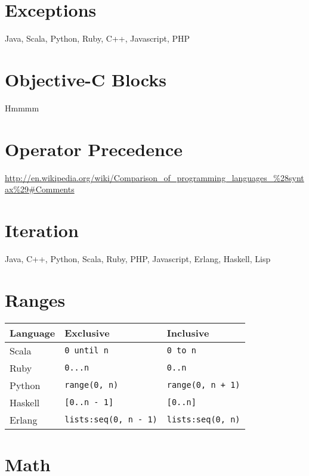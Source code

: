 \documentclass{article}
\begin{document}
\section{Exceptions}
Java, Scala, Python, Ruby, C++, Javascript, PHP

\section{Objective-C Blocks}
Hmmmm

\section{Operator Precedence}
\url{http://en.wikipedia.org/wiki/Comparison_of_programming_languages_%28syntax%29#Comments}

\section{Iteration}
Java, C++, Python, Scala, Ruby, PHP, Javascript, Erlang, Haskell, Lisp

\section{Ranges}
\begin{longtabu} to 0.75\linewidth { X X X }
	Language & Exclusive & Inclusive \\
	\hline
	Scala & \lstinline$0 until n$ & \lstinline$0 to n$ \\
	Ruby & \lstinline$0...n$ & \lstinline$0..n$ \\
	Python & \lstinline$range(0, n)$ & \lstinline$range(0, n + 1)$ \\
	Haskell & \lstinline$[0..n - 1]$ & \lstinline$[0..n]$ \\
	Erlang & \lstinline$lists:seq(0, n - 1)$ & \lstinline$lists:seq(0, n)$ \\
\end{longtabu}

\section{Math}
\end{document}
